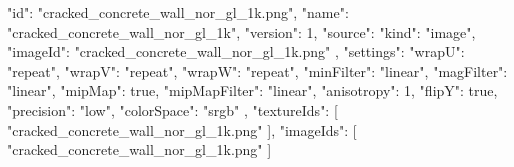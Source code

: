 {
  "id": "cracked_concrete_wall_nor_gl_1k.png",
  "name": "cracked_concrete_wall_nor_gl_1k",
  "version": 1,
  "source": {
    "kind": "image",
    "imageId": "cracked_concrete_wall_nor_gl_1k.png"
  },
  "settings": {
    "wrapU": "repeat",
    "wrapV": "repeat",
    "wrapW": "repeat",
    "minFilter": "linear",
    "magFilter": "linear",
    "mipMap": true,
    "mipMapFilter": "linear",
    "anisotropy": 1,
    "flipY": true,
    "precision": "low",
    "colorSpace": "srgb"
  },
  "textureIds": [
    "cracked_concrete_wall_nor_gl_1k.png"
  ],
  "imageIds": [
    "cracked_concrete_wall_nor_gl_1k.png"
  ]
}
